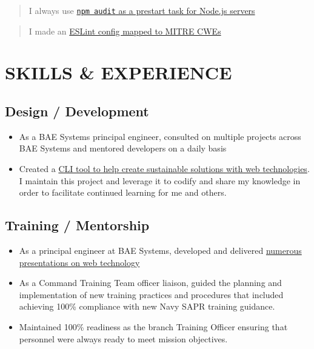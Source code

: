\documentclass[10pt]{article}
\def\tightlist{}
\begin{document}
\begin{quote}
I always use
\href{https://github.com/jhwohlgemuth/tomo-cli/blob/master/src/commands/create-server/index.js\#L82}{\texttt{npm\ audit}
as a prestart task for Node.js servers}
\end{quote}

\begin{quote}
I made an
\href{https://github.com/omahajs/eslint-config-omaha-prime-grade/blob/master/RULES_FOR_SECURITY.md}{ESLint
config mapped to MITRE CWEs}
\end{quote}

\section{SKILLS \& EXPERIENCE}\label{skills-experience}

\subsection{Design / Development}\label{design-development}

\begin{itemize}
\tightlist
\item
  As a BAE Systems principal engineer, consulted on multiple projects
  across BAE Systems and mentored developers on a daily basis
\item
  Created a \href{https://github.com/jhwohlgemuth/tomo-cli}{CLI tool to
  help create sustainable solutions with web technologies}. I maintain
  this project and leverage it to codify and share my knowledge in order
  to facilitate continued learning for me and others.
\end{itemize}

\subsection{Training / Mentorship}\label{training-mentorship}

\begin{itemize}
\tightlist
\item
  As a principal engineer at BAE Systems, developed and delivered
  \href{https://github.com/jhwohlgemuth?utf8=\%E2\%9C\%93\&tab=repositories\&q=slides\&type=source\&language=}{numerous
  presentations on web technology}
\item
  As a Command Training Team officer liaison, guided the planning and
  implementation of new training practices and procedures that included
  achieving 100\% compliance with new Navy SAPR training guidance.
\item
  Maintained 100\% readiness as the branch Training Officer ensuring
  that personnel were always ready to meet mission objectives.
\end{itemize}
\end{document}
